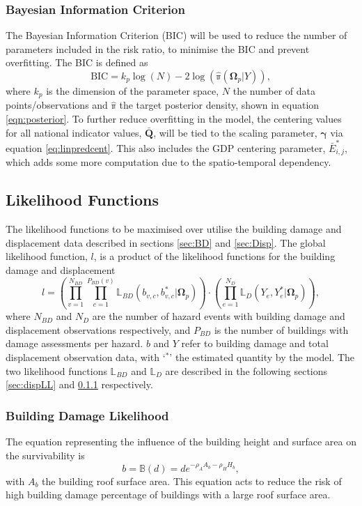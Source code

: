 \documentclass[10pt,a4paper]{article}
\begin{document}
\begin{multicols}{1}
\subsubsection{Bayesian Information Criterion}\label{sec:BIC}
The Bayesian Information Criterion (BIC) will be used to reduce the number of parameters included in the risk ratio, to minimise the BIC and prevent overfitting. The BIC is defined as
\begin{equation}\label{eq:BIC}
  \text{BIC}=k_p\log(N) - 2\log\left(\hat{\mathbb{\pi}}(\boldsymbol{\Omega}_p|Y)\right),
\end{equation}
where $k_p$ is the dimension of the parameter space, $N$ the number of data points/observations and $\hat{\mathbb{\pi}}$ the target posterior density, shown in equation \ref{eqn:posterior}. To further reduce overfitting in the model, the centering values for all national indicator values, $\bar{\boldsymbol{Q}}$, will be tied to the scaling parameter, $\boldsymbol{\gamma}$ via equation \ref{eq:linpredcent}. This also includes the GDP centering parameter, $\bar{E}^*_{i,j}$, which adds some more computation due to the spatio-temporal dependency.
\subsection{Likelihood Functions}\label{sec:likelihoods}
The likelihood functions to be maximised over utilise the building damage and displacement data described in sections \ref{sec:BD} and \ref{sec:Disp}. The global likelihood function, $l$, is a product of the likelihood functions for the building damage and displacement
\begin{equation}
  l=\left(\prod_{v=1}^{N_{BD}}\prod_{c=1}^{P_{BD}(v)}\mathbb{L}_{BD}(b_{v,c},b_{v,c}^*|\boldsymbol{\Omega}_p)\right)\cdot\left(\prod_{e=1}^{N_D}\mathbb{L}_D(Y_e,Y_e^*|\boldsymbol{\Omega}_p)\right),
\end{equation}
where $N_{BD}$ and $N_D$ are the number of hazard events with building damage and displacement observations respectively, and $P_{BD}$ is the number of buildings with damage assessments per hazard. $b$ and $Y$ refer to building damage and total displacement observation data, with `$^*$' the estimated quantity by the model. The two likelihood functions $\mathbb{L}_{BD}$ and $\mathbb{L}_D$ are described in the following sections \ref{sec:dispLL} and \ref{sec:BDLL} respectively.
\subsubsection{Building Damage Likelihood}\label{sec:BDLL}
The equation representing the influence of the building height and surface area on the survivability is 
\begin{equation}\label{eq:BD}
  b=\mathbb{B}(d)=de^{-\rho_A A_b-\rho_HH_b},
\end{equation}
with $A_b$ the building roof surface area. This equation acts to reduce the risk of high building damage percentage of buildings with a large roof surface area.\\


\end{multicols}
\end{document}
